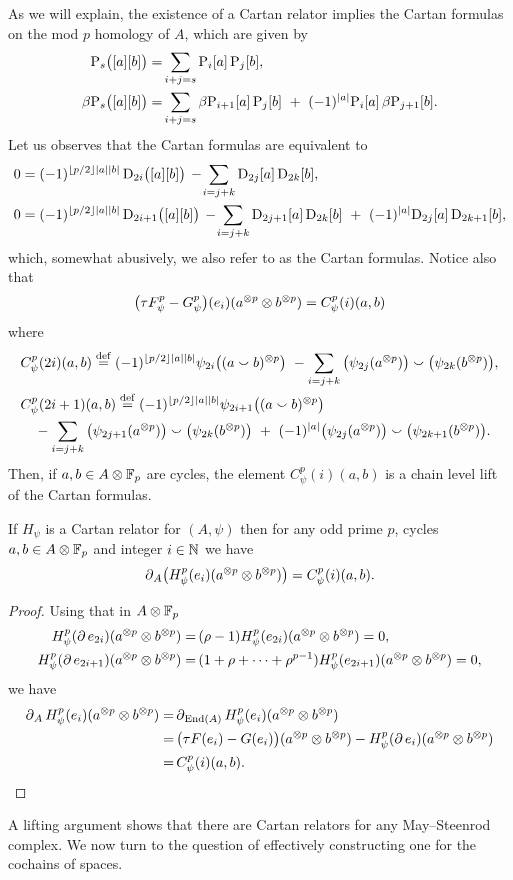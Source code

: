 As we will explain, the existence of a Cartan relator implies the Cartan formulas on the mod $p$ homology of $A$, which are given by
\begin{align*}
	\mathrm{P}_s\big([a][b]\big) =&
	\sum_{i+j=s} \mathrm{P}_i[a] \, \mathrm{P}_j[b], \\
	\beta\mathrm{P}_s\big([a][b]\big) =&
	\sum_{i+j=s} \beta\mathrm{P}_{i+1}[a] \, \mathrm{P}_j[b] \ +\ (-1)^{\lvert a\rvert} \mathrm{P}_i[a] \, \beta\mathrm{P}_{j+1}[b].
\end{align*}
Let us observes that the Cartan formulas are equivalent to
\begin{align*}
	0 &= (-1)^{\floor{p/2}\bars{a}\bars{b}} \, \rD_{2i}\big([a][b]\big) \,-\!
	\sum_{i=j+k} \rD_{2j}[a] \, \rD_{2k}[b], \\
	0 &= (-1)^{\floor{p/2}\bars{a}\bars{b}} \, \rD_{2i+1}\big([a][b]\big) \,-\!
	\sum_{i=j+k} \rD_{2j+1}[a] \, \rD_{2k}[b] \ +\ (-1)^{\bars{a}}\rD_{2j}[a] \, \rD_{2k+1}[b],
\end{align*}
which, somewhat abusively, we also refer to as the Cartan formulas.
Notice also that
\[
\big(\tau F_\psi^p - G_\psi^p\big)(e_i)(a^{\otimes p} \otimes b^{\otimes p}) = C^p_\psi(i)(a,b)
\]
where
\begin{align*}
	&C_\psi^p(2i)(a,b) \stackrel{\mathrm{def}}{=} (-1)^{\lfloor p/2\rfloor\lvert a\rvert\lvert b\rvert} \psi_{2i}\big((a \smallsmile b)^{\otimes p}\big) \ -
	\sum_{i=j+k}\big(\psi_{2j}(a^{\otimes p})\big) \smallsmile \big(\psi_{2k}(b^{\otimes p})\big), \\
	&C_\psi^p(2i+1)(a,b) \stackrel{\mathrm{def}}{=} (-1)^{\lfloor p/2\rfloor\lvert a\rvert\lvert b\rvert} \psi_{2i+1}\big((a \smallsmile b)^{\otimes p}\big) \\
	&\quad -\sum_{i=j+k} \big(\psi_{2j+1}(a^{\otimes p})\big) \smallsmile \big(\psi_{2k}(b^{\otimes p})\big)\ +\
	(-1)^{\lvert a\rvert}\big(\psi_{2j}(a^{\otimes p})\big) \smallsmile \big(\psi_{2k+1}(b^{\otimes p})\big).
\end{align*}
Then, if $a,b \in A \otimes {\mathbb{F}_p}$ are cycles, the element $C_\psi^p(i)(a,b)$ is a chain level lift of the Cartan formulas.

\begin{theorem}
	If $H_\psi$ is a Cartan relator for $(A, \psi)$ then for any odd prime $p$, cycles $a,b \in A \otimes {\mathbb{F}_p}$ and integer $i \in \mathbb{N}$ we have
	\[
	\operatorname{\partial}_A\!\big(H_\psi^p(e_i)(a^{\otimes p} \otimes b^{\otimes p})\big) = C_\psi^p(i)(a, b).
	\]
\end{theorem}

\begin{proof}
	Using that in $A \otimes {\mathbb{F}_p}$
	\begin{align*}
		H_\psi^p(\operatorname{\partial} e_{2i})(a^{\otimes p} \otimes b^{\otimes p}) =&\,
		(\rho - 1) H_\psi^p(e_{2i})(a^{\otimes p} \otimes b^{\otimes p}) = 0, \\
		H_\psi^p(\operatorname{\partial} e_{2i+1})(a^{\otimes p} \otimes b^{\otimes p}) =&\,
		(1+\rho+\dots+\rho^{p-1}) H_\psi^p(e_{2i+1})(a^{\otimes p} \otimes b^{\otimes p}) = 0,
	\end{align*}
	we have
	\begin{align*}
		\operatorname{\partial}_A H_\psi^p(e_i)(a^{\otimes p} \otimes b^{\otimes p}) =&
		\operatorname{\partial}_{\mathrm{End}(A)} H_\psi^p(e_i)(a^{\otimes p} \otimes b^{\otimes p}) \\ =& \,
		\big(\tau F(e_i) - G(e_i)\big)(a^{\otimes p} \otimes b^{\otimes p}) -
		H_\psi^p(\operatorname{\partial} e_i)(a^{\otimes p} \otimes b^{\otimes p}) \\ =&\,
		C^p_\psi(i)(a,b).\qedhere
	\end{align*}
\end{proof}

A lifting argument shows that there are Cartan relators for any May--Steenrod complex.
We now turn to the question of effectively constructing one for the cochains of spaces.